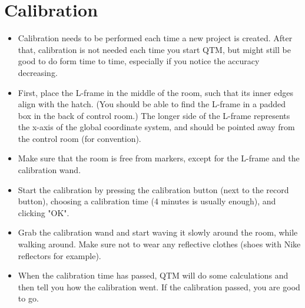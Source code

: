 \documentclass{article}
\begin{document}
\section{Calibration}
\begin{itemize}
    \item Calibration needs to be performed each time a new project is created. After that, calibration is not needed each time you start QTM, but might still be good to do form time to time, especially if you notice the accuracy decreasing.
    \item First, place the L-frame in the middle of the room, such that its inner edges align with the hatch. (You should be able to find the L-frame in a padded box in the back of control room.) The longer side of the L-frame represents the x-axis of the global coordinate system, and should be pointed away from the control room (for convention).
    \item Make sure that the room is free from markers, except for the L-frame and the calibration wand.
    \item Start the calibration by pressing the calibration button (next to the record button), choosing a calibration time (4 minutes is usually enough), and clicking "OK".
    \item Grab the calibration wand and start waving it slowly around the room, while walking around. Make sure not to wear any reflective clothes (shoes with Nike reflectors for example).
    \item When the calibration time has passed, QTM will do some calculations and then tell you how the calibration went. If the calibration passed, you are good to go.
\end{itemize}
\end{document}
